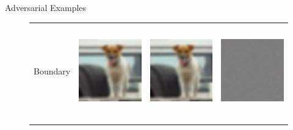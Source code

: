 \documentclass[final]{beamer}
\newlength{\onecolwid}
\newlength{\twocolwid}
\begin{document}
\begin{frame}[t]
\begin{columns}[t]
\begin{column}{\twocolwid}
\begin{columns}[t,totalwidth=\twocolwid]
\begin{column}{\onecolwid}
\begin{block}{Adversarial Examples}
\begin{figure}[h]
\begin{tabular}{rlll}
			Boundary & \includegraphics[height=4cm, align=c]{../figures/boundary_orig.pdf} & \includegraphics[height=4cm, align=c]{../figures/boundary_adversarial.pdf} & \includegraphics[height=4cm, align=c]{../figures/boundary_diff.pdf}\\
			\\

\end{tabular}
\end{figure}
\end{block}
\end{column}
\end{columns}
\end{column}
\end{columns}
\end{frame}
\end{document}

